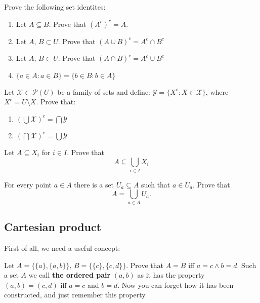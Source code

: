 \begin{prob}
	Prove the following set identites:
	\begin{enumerate}
		\item Let $A\subseteq B.$ Prove that $(A^c)^c = A$.
		\item Let $A,\, B\subset U$. Prove that $(A\cup B)^c = A^c\cap B^c$
		\item Let $A,\, B\subset U$. Prove that $(A\cap B)^c = A^c\cup B^c$
		\item $\{a\in A : a\in B\} = \{b\in B : b\in A\}$
	\end{enumerate}
\end{prob}

\begin{prob}
	Let $\mathcal X \subset \mathcal P(U)$ be a family of sets and define:
  $\mathcal Y=\{X^c : X\in \mathcal X\}$, where $X^c=U\setminus X$.
  Prove that:
  \begin{enumerate}
    \item $(\bigcup \mathcal X)^c = \bigcap \mathcal Y$
    \item $(\bigcap \mathcal X)^c = \bigcup \mathcal Y$
  \end{enumerate}
\end{prob}

\begin{exercise}
	Let $A\subseteq X_i$ for $i\in I$. Prove that
	$$A\subseteq \bigcup_{i\in I} X_i$$
\end{exercise}

\begin{exercise}
	For every point $a\in A$ there is a set $U_a\subseteq A$ such that $a\in U_a$.
	Prove that $$A=\bigcup_{a\in A} U_a.$$
\end{exercise}

\subsection{Cartesian product}
First of all, we need a useful concept:
\begin{prob}
	Let $A=\{\{a\}, \{a,b\}\},\, B=\{\{c\},\{c,d\}\}$. Prove that $A=B$ iff $a=c\wedge b=d$. Such a set $A$ we call
	\textbf{the ordered pair} $(a,b)$ as it has the property $(a,b)=(c,d)$ iff $a=c$ and $b=d$.
	Now you can forget how it has been constructed, and just remember this property.
\end{prob}

